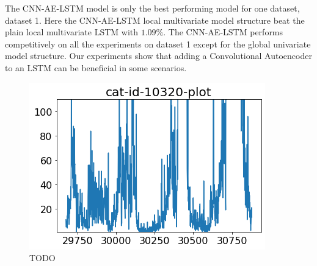 















\iffalse
  The CNN-AE-LSTM model is only the best performing model for one dataset, dataset 1.
  Here the CNN-AE-LSTM local multivariate model structure beat the plain local multivariate LSTM with $1.09\%$.
  The CNN-AE-LSTM performs competitively on all the experiments on dataset 1 except for the global univariate model structure.
  Our experiments show that adding a Convolutional Autoencoder to an LSTM can be beneficial in some scenarios.


  \begin{figure}[h!]
    \centering
    \includegraphics[width=\textwidth]{./figs/code_generated/data_exploration/cat-id-10320-plot.png}
    \hfill
    \caption{TODO}
    \label{fig:cat-id-10320-cnn-ae-beat-lstm}
  \end{figure}

